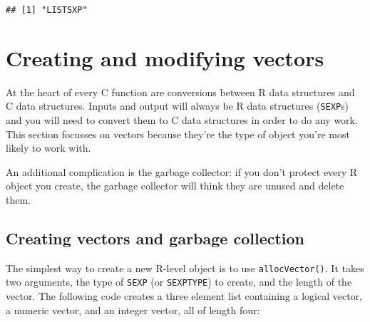 \begin{verbatim}
## [1] "LISTSXP"
\end{verbatim}

\hypertarget{c-vectors}{%
\section{Creating and modifying vectors}\label{c-vectors}}

At the heart of every C function are conversions between R data
structures and C data structures. Inputs and output will always be R
data structures (\texttt{SEXP}s) and you will need to convert them to C
data structures in order to do any work. This section focusses on
vectors because they're the type of object you're most likely to work
with.

An additional complication is the garbage collector: if you don't
protect every R object you create, the garbage collector will think they
are unused and delete them.

\hypertarget{creating-vectors-and-garbage-collection}{%
\subsection{Creating vectors and garbage
collection}\label{creating-vectors-and-garbage-collection}}

The simplest way to create a new R-level object is to use
\texttt{allocVector()}. It takes two arguments, the type of
\texttt{SEXP} (or \texttt{SEXPTYPE}) to create, and the length of the
vector. The following code creates a three element list containing a
logical vector, a numeric vector, and an integer vector, all of length
four: 

\begin{Shaded}
\begin{Highlighting}[]
\StringTok{ }\NormalTok{(} 


\NormalTok{)}
\NormalTok{()}
\end{Highlighting}
\end{Shaded}

